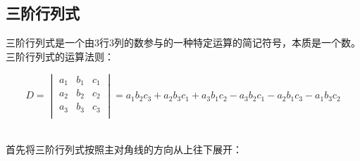 \documentclass[UTF8]{ctexart}
\begin{document}
\newpage

\subsection{三阶行列式}
    \setcounter{equation}{0}
    三阶行列式是一个由$3$行$3$列的数参与的一种特定运算的简记符号，本质是一个数。\\[3mm]
    三阶行列式的运算法则：
    \begin{large}
        \begin{equation*}
            D=
            \begin{vmatrix}
                a_1&b_1&c_1\\
                a_2&b_2&c_2\\
                a_3&b_3&c_3\\
            \end{vmatrix}
            =a_1b_2c_3+a_2b_3c_1+a_3b_1c_2
            -a_3b_2c_1-a_2b_1c_3-a_1b_3c_2
        \end{equation*}
    \end{large}\\[3mm]
    首先将三阶行列式按照主对角线的方向从上往下展开：
\end{document}
